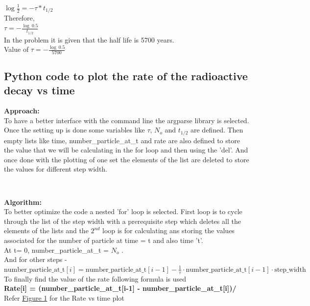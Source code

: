\documentclass[11pt]{article}
\begin{document}
$\log\frac{1}{2} = -\tau*t_{1/2}$\\
Therefore,\\

$\tau = -\frac{\log\ 0.5}{t_{1/2}}$\\
In the problem it is given that the half life is 5700 years.\\

Value of $\tau = -\frac{\log\ 0.5}{5700}$\\


\begin{figure}[h]

\end{figure}

\subsection{Python code to plot the rate of the radioactive decay vs time}
\begin{raggedright}
\begin{justify}
\textbf{Approach:}\\
To have a better interface with the command line the argparse library is selected. Once the setting up is done some variables like $\tau$, $N_{o}$ and $t_{1/2}$ are defined. Then empty lists like time, number\_particle\_at\_t and rate are also defined to store the value that we will be calculating in the for loop and then using the 'del'. And once done with the plotting of one set the elements of the list are deleted to store the values for different step width.
\end{justify}
\end{raggedright}\\

\begin{raggedright}
\begin{justify}
\textbf{Algorithm:}\\
To better optimize the code a nested 'for' loop is selected. First loop is to cycle through the list of the step width with a prerequisite step which deletes all the elements of the lists and the $2^{nd}$ loop is for calculating ans storing the values associated for the number of particle at time = t and also time 't'.\\
At t= 0, number\_particle\_at\_t = $N_{o}$ .\\
And for other steps - \\
\textbf{\( \text{number\_particle\_at\_t}[i]=\text{number\_particle\_at\_t}[i-1] - \frac{1}{\tau} \cdot \text{number\_particle\_at\_t}[i-1] \cdot \text{step\_width}\)} \\
To finally find the value of the rate following formula is used\\
\textbf{Rate[i] = (number\_particle\_at\_t[i-1] - number\_particle\_at\_t[i])/}\\
Refer \hyperref[fig:Rate of radioactive decay for step width = 10, 100]{Figure 1} for the Rate vs time plot
\end{justify}
\end{raggedright}
\end{document}
